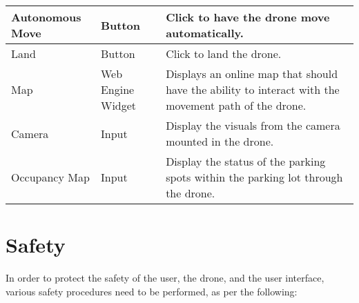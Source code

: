 \documentclass[12pt]{article}
\begin{document}
\begin{longtable}{| p{4cm} | p{4cm} | p{7cm} |}
\hline
Autonomous Move & Button & Click to have the drone move automatically. \\
\hline
Land & Button & Click to land the drone. \\
\hline
Map & Web Engine Widget & Displays an online map that should have the ability to interact with the movement path of the drone. \\
\hline
Camera & Input & Display the visuals from the camera mounted in the drone. \\
\hline
Occupancy Map & Input & Display the status of the parking spots within the parking lot through the drone. \\
\hline
\end{longtable}

\section{Safety}

In order to protect the safety of the user, the drone, and the user interface, various safety procedures need to be performed, as per the following:
\end{document}
